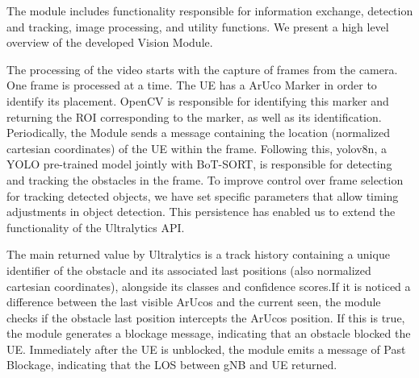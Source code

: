 \begin{table}[H]
    \caption{Summary of each message type}
    \label{tab:message_type}
    \centering
\end{table}

The module includes functionality responsible for information exchange, detection and tracking, image processing, and utility functions.
We present a high level overview of the developed Vision Module.

The processing of the video starts with the capture of frames from the camera.
One frame is processed at a time.
The UE has a ArUco Marker in order to identify its placement.
OpenCV is responsible for identifying this marker and returning the ROI corresponding to the marker, as well as its identification.
Periodically, the Module sends a message containing the location (normalized cartesian coordinates) of the UE within the frame\@.
Following this, yolov8n, a YOLO pre-trained model jointly with BoT-SORT, is responsible for detecting and tracking the obstacles in the frame.
To improve control over frame selection for tracking detected objects, we have set specific parameters that allow timing adjustments in object detection.
This persistence has enabled us to extend the functionality of the Ultralytics API\@.

The main returned value by Ultralytics is a track history containing a unique identifier of the obstacle and its associated last positions (also normalized cartesian coordinates), alongside its classes and confidence scores.If it is noticed a difference between the last visible ArUcos and the current seen, the module checks if the obstacle last position intercepts the ArUcos position.
If this is true, the module generates a blockage message, indicating that an obstacle blocked the UE\@.
Immediately after the UE is unblocked, the module emits a message of Past Blockage, indicating that the LOS between gNB and UE returned.

